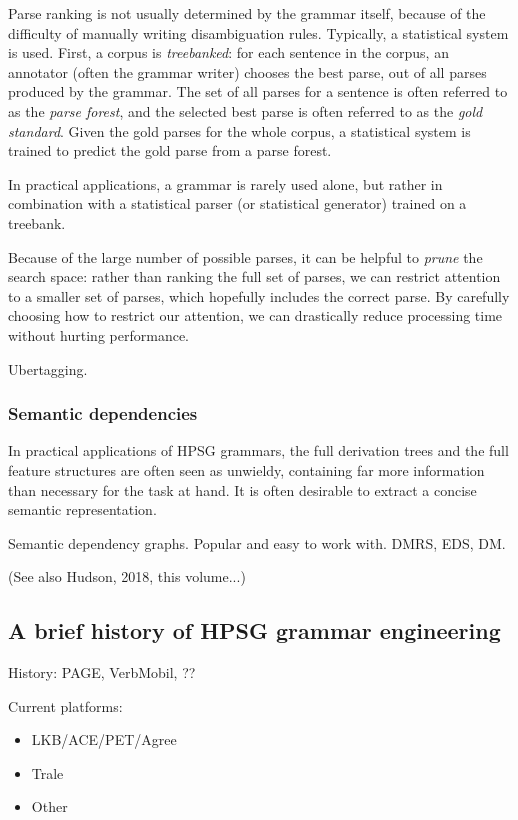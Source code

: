 \documentclass[output=paper]{langsci/langscibook}
\begin{document}
Parse ranking is not usually determined by the grammar itself,
because of the difficulty of manually writing disambiguation rules.
Typically, a statistical system is used.
First, a corpus is \textit{treebanked}:
for each sentence in the corpus,
an annotator (often the grammar writer) chooses the best parse,
out of all parses produced by the grammar.
The set of all parses for a sentence is often referred to as the \textit{parse forest},
and the selected best parse is often referred to as the \textit{gold standard}.
Given the gold parses for the whole corpus, a statistical system is trained
to predict the gold parse from a parse forest.

In practical applications, a grammar is rarely used alone,
but rather in combination with a statistical parser (or statistical generator) trained on a treebank.


Because of the large number of possible parses,
it can be helpful to \textit{prune} the search space:
rather than ranking the full set of parses,
we can restrict attention to a smaller set of parses,
which hopefully includes the correct parse.
By carefully choosing how to restrict our attention,
we can drastically reduce processing time without hurting performance.

Ubertagging.


\subsubsection{Semantic dependencies}

In practical applications of HPSG grammars,
the full derivation trees and the full feature structures are often seen as unwieldy,
containing far more information than necessary for the task at hand.
It is often desirable to extract a concise semantic representation.

Semantic dependency graphs.
Popular and easy to work with.
DMRS, EDS, DM.

(See also Hudson, 2018, this volume...)



\subsection{A brief history of HPSG grammar engineering}
\label{sec:history}

History: PAGE, VerbMobil, ?? %

Current platforms:
    \begin{itemize}
    \item LKB/ACE/PET/Agree
    \item Trale
    \item Other
    \end{itemize}
\end{document}
